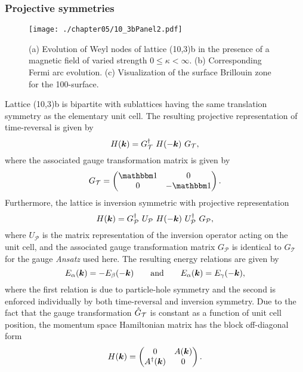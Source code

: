 \subsubsection{Projective symmetries}
%
%
%
\begin{figure}[tb]
	\centering
	\texttt{[image: ./chapter05/10\_3bPanel2.pdf]}
	\caption{
		(a) Evolution of Weyl nodes of lattice (10,3)b in the presence of a magnetic field of varied strength $0 \leq \kappa < \infty$.
		(b) Corresponding Fermi arc evolution.
		(c) Visualization of the surface Brillouin zone for the 100-surface.
	}
	\label{fig:chapter05_10_3bPanel2}
\end{figure}
%
Lattice (10,3)b is bipartite with sublattices having the same translation symmetry as the elementary unit cell.
The resulting projective representation of time-reversal is given by
%
\begin{equation}
	H(\bm{k}) = G^{\dagger}_{\mathcal{T}}~H(-\bm{k})~G_{\mathcal{T}},
\end{equation}
%
where the associated gauge transformation matrix is given by
%
\begin{equation}
	G_{\mathcal{T}} =
		\begin{pmatrix}
			\id & 0 \\
			0	& -\id
		\end{pmatrix}.
\end{equation}
%
Furthermore, the lattice is inversion symmetric with projective representation
%
\begin{equation}
	H(\bm{k}) = G^{\dagger}_{\mathcal{P}}~U_{\mathcal{P}}~H(-\bm{k})~U^{\dagger}_{\mathcal{P}}~G_{\mathcal{P}},
\end{equation}
%
where $U_{\mathcal{P}}$ is the matrix representation of the inversion operator acting on the unit cell, and the associated gauge transformation matrix $G_{\mathcal{P}}$ is identical to $G_{\mathcal{T}}$ for the gauge \textit{Ansatz} used here.
The resulting energy relations are given by
%
\begin{equation}
	E_{\alpha}(\bm{k}) = -E_{\beta}(-\bm{k}) \qquad {\rm and } \qquad E_{\alpha}(\bm{k}) = E_{\gamma}(-\bm{k}),
\end{equation}
%
where the first relation is due to particle-hole symmetry and the second is enforced individually by both time-reversal and inversion symmetry.
Due to the fact that the gauge transformation $\hat{G}_{\mathcal{T}}$ is constant as a function of unit cell position, the momentum space Hamiltonian matrix has the block off-diagonal form
%
\begin{equation}
	H(\bm{k}) =
		\begin{pmatrix}
			0			& A(\bm{k}) \\
			A^{\dagger}(\bm{k})	& 0
		\end{pmatrix}.
\end{equation}
%
\newpage


